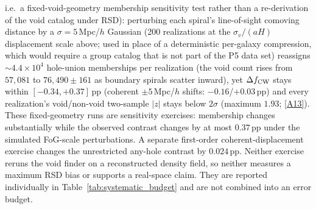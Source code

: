 \documentclass[aps,prd,twocolumn,superscriptaddress,showpacs,preprintnumbers,nofootinbib,longbibliography,floatfix]{revtex4-2}
\newcommand{\repoBase}{https://github.com/Hubify-Projects/bigbounce/blob/main}
\begin{document}
i.e.\ a fixed-void-geometry membership sensitivity test rather than a
re-derivation of the void catalog under RSD):
perturbing each spiral's line-of-sight comoving distance by a
$\sigma\!=\!5$\,Mpc/$h$ Gaussian (200 realizations at the
$\sigma_v/(aH)$ displacement scale above; used in place of a
deterministic per-galaxy compression, which would require a group
catalog that is not part of the P5 data set) reassigns
$\sim\!4.4\times10^{4}$ hole-union memberships per realization (the
void count rises from $57{,}081$ to $76{,}490 \pm 161$ as boundary
spirals scatter inward), yet $\Delta f_{\rm CW}$ stays within
$[-0.34, +0.37]$\,pp (coherent $\pm 5$\,Mpc/$h$ shifts:
$-0.16$/$+0.03$\,pp) and every realization's void/non-void two-sample
$|z|$ stays below $2\sigma$ (maximum $1.93$;
\href{\repoBase/pipelines/p5\_desi\_chirality/outputs/26\_r27conf\_ess\_recomputes.json}{[A13]}).
These fixed-geometry runs are sensitivity exercises: membership changes
substantially while the observed contrast changes by at most $0.37$\,pp
under the simulated FoG-scale perturbations. A separate first-order
coherent-displacement exercise changes the unrestricted any-hole
contrast by $0.024$\,pp. Neither exercise reruns the void finder on a
reconstructed density field, so neither measures a maximum RSD bias or
supports a real-space claim. They are reported individually in
Table~\ref{tab:systematic_budget} and are not combined into an error
budget.
\end{document}
